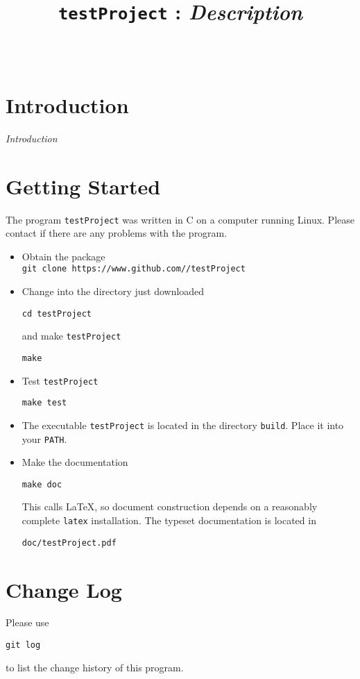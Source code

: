 \documentclass[a4paper, english]{article}
\begin{document}
\title{\texttt{testProject} : \emph{Description}}
\author{\\\small}
\date{}
\maketitle

\section{Introduction} 
\emph{Introduction}

\section{Getting Started}
The program \texttt{testProject} was written in C on a computer running Linux.
Please contact \texttt{} if there are any problems
with the program.
\begin{itemize}
\item Obtain the package\\
\texttt{git clone https://www.github.com//testProject}
\item Change into the directory just downloaded
\begin{verbatim}
cd testProject
\end{verbatim}
and make \texttt{testProject}
\begin{verbatim}
make
\end{verbatim}
\item Test \texttt{testProject}
\begin{verbatim}
make test
\end{verbatim}
\item The executable \texttt{testProject} is located in the
  directory \texttt{build}. Place it into your \texttt{PATH}.
\item Make the documentation
\begin{verbatim}
make doc
\end{verbatim}
This calls \LaTeX{}, so document construction depends on a reasonably
complete \texttt{latex} installation. The typeset documentation is located
in
\begin{verbatim}
doc/testProject.pdf
\end{verbatim}
\end{itemize}

\section{Change Log}
Please use
\begin{verbatim}
git log
\end{verbatim}
to list the change history of this program.

\end{document}
